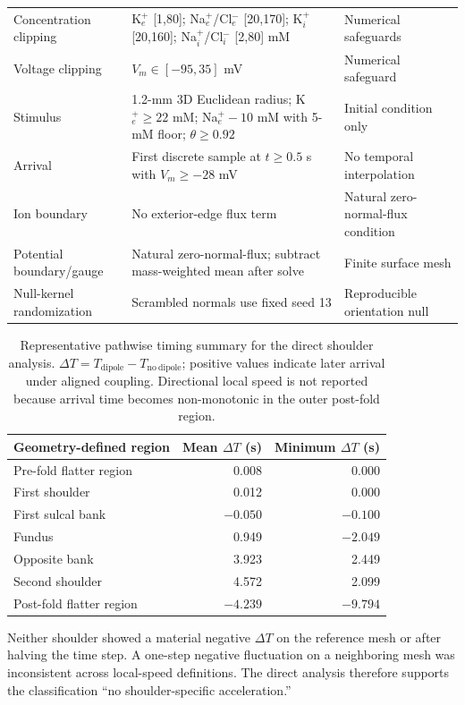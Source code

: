 \documentclass[12pt]{article}
\begin{document}
\begin{table}[t]
{\begin{tabular}{@{}lll@{}}
Concentration clipping & K$^+_e$ [1,80]; Na$^+_e$/Cl$^-_e$ [20,170]; K$^+_i$ [20,160]; Na$^+_i$/Cl$^-_i$ [2,80] mM & Numerical safeguards \\
Voltage clipping & $V_m\in[-95,35]$ mV & Numerical safeguard \\
Stimulus & 1.2-mm 3D Euclidean radius; K$^+_e\ge22$ mM; Na$^+_e-10$ mM with 5-mM floor; $\theta\ge0.92$ & Initial condition only \\
Arrival & First discrete sample at $t\ge0.5$ s with $V_m\ge-28$ mV & No temporal interpolation \\
Ion boundary & No exterior-edge flux term & Natural zero-normal-flux condition \\
Potential boundary/gauge & Natural zero-normal-flux; subtract mass-weighted mean after solve & Finite surface mesh \\
Null-kernel randomization & Scrambled normals use fixed seed 13 & Reproducible orientation null \\
\bottomrule
\end{tabular}%
}
\end{table}

\begin{table}[t]
\centering
\caption{Representative pathwise timing summary for the direct shoulder analysis. $\Delta T=T_{\mathrm{dipole}}-T_{\mathrm{no\ dipole}}$; positive values indicate later arrival under aligned coupling. Directional local speed is not reported because arrival time becomes non-monotonic in the outer post-fold region.}
\label{tab:shoulder_summary}
\small
\begin{tabular}{@{}lrr@{}}
\toprule
Geometry-defined region & Mean $\Delta T$ (s) & Minimum $\Delta T$ (s) \\
\midrule
Pre-fold flatter region & 0.008 & 0.000 \\
First shoulder & 0.012 & 0.000 \\
First sulcal bank & $-0.050$ & $-0.100$ \\
Fundus & 0.949 & $-2.049$ \\
Opposite bank & 3.923 & 2.449 \\
Second shoulder & 4.572 & 2.099 \\
Post-fold flatter region & $-4.239$ & $-9.794$ \\
\bottomrule
\end{tabular}
\end{table}

Neither shoulder showed a material negative $\Delta T$ on the reference mesh or after halving the time step. A one-step negative fluctuation on a neighboring mesh was inconsistent across local-speed definitions. The direct analysis therefore supports the classification ``no shoulder-specific acceleration.''
\end{document}
